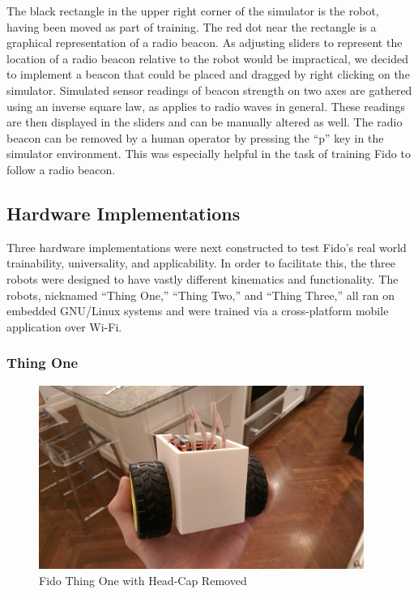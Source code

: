 The black rectangle in the upper right corner of the simulator is the robot, having been moved as part of training.
The red dot near the rectangle is a graphical representation of a radio beacon.
As adjusting sliders to represent the location of a radio beacon relative to the robot would be impractical, we decided to implement a beacon that could be placed and dragged by right clicking on the simulator.
Simulated sensor readings of beacon strength on two axes are gathered using an inverse square law, as applies to radio waves in general.
These readings are then displayed in the sliders and can be manually altered as well.
The radio beacon can be removed by a human operator by pressing the ``p'' key in the simulator environment.
This was especially helpful in the task of training Fido to follow a radio beacon.

\subsection{Hardware Implementations}

Three hardware implementations were next constructed to test Fido's real world trainability, universality, and applicability.
In order to facilitate this, the three robots were designed to have vastly different kinematics and functionality.
The robots, nicknamed ``Thing One,'' ``Thing Two,'' and ``Thing Three,'' all ran on embedded GNU/Linux systems and were trained via a cross-platform mobile application over Wi-Fi.

\subsubsection{Thing One}
\begin{figure}[H]
	\centering
	\includegraphics[height=6cm]{Figures/Prototype.jpg}
	\caption{Fido Thing One with Head-Cap Removed}
\end{figure}

